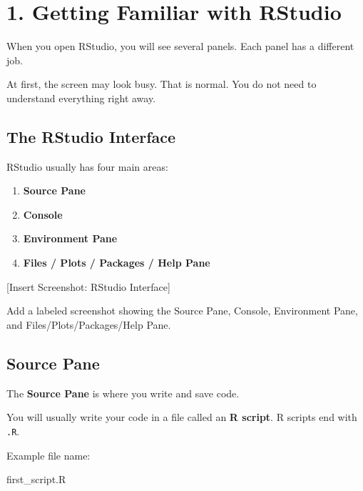\documentclass[
  letterpaper,
  DIV=11,
  numbers=noendperiod]{scrartcl}
\author{}
\date{}
\newenvironment{Shaded}{\begin{snugshade}}{\end{snugshade}}
\newcommand{\NormalTok}[1]{\textcolor[rgb]{0.00,0.23,0.31}{#1}}
\providecommand{\tightlist}{%
  \setlength{\itemsep}{0pt}\setlength{\parskip}{0pt}}
\renewcommand*\contentsname{Table of contents}
\newcommand\contentsname{Table of contents}
\begin{document}
\renewcommand*\contentsname{Table of contents}
{
\setcounter{tocdepth}{3}
\tableofcontents
}

\section{1. Getting Familiar with
RStudio}\label{getting-familiar-with-rstudio}

When you open RStudio, you will see several panels. Each panel has a
different job.

At first, the screen may look busy. That is normal. You do not need to
understand everything right away.

\subsection{The RStudio Interface}\label{the-rstudio-interface}

RStudio usually has four main areas:

\begin{enumerate}
\def\labelenumi{\arabic{enumi}.}
\tightlist
\item
  \textbf{Source Pane}
\item
  \textbf{Console}
\item
  \textbf{Environment Pane}
\item
  \textbf{Files / Plots / Packages / Help Pane}
\end{enumerate}

{[}Insert Screenshot: RStudio Interface{]}

Add a labeled screenshot showing the Source Pane, Console, Environment
Pane, and Files/Plots/Packages/Help Pane.

\subsection{Source Pane}\label{source-pane}

The \textbf{Source Pane} is where you write and save code.

You will usually write your code in a file called an \textbf{R script}.
R scripts end with \texttt{.R}.

Example file name:

\begin{Shaded}
\begin{Highlighting}[]
\NormalTok{first\_script.R}
\end{Highlighting}
\end{Shaded}
\end{document}
